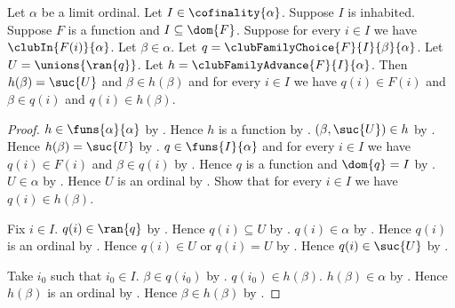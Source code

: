 \begin{proposition}\label{club_family_advance_properties}
    Let $\alpha$ be a limit ordinal.
    Let $I\in\cofinality{\alpha}$.
    Suppose $I$ is inhabited.
    Suppose $F$ is a function and $I\subseteq\dom{F}$.
    Suppose for every $i\in I$ we have $\clubIn{F(i)}{\alpha}$.
    Let $\beta\in\alpha$.
    Let $q=\clubFamilyChoice{F}{I}{\beta}{\alpha}$.
    Let $U=\unions{\ran{q}}$.
    Let $h=\clubFamilyAdvance{F}{I}{\alpha}$.
    Then $h(\beta)=\suc{U}$ and $\beta\in h(\beta)$ and
        for every $i\in I$ we have
            $q(i)\in F(i)$ and $\beta\in q(i)$ and
            $q(i)\in h(\beta)$.
\end{proposition}
\begin{proof}
    $h\in\funs{\alpha}{\alpha}$
        by .
    Hence $h$ is a function by .
    $(\beta,\suc{U})\in h$ by .
    Hence $h(\beta)=\suc{U}$ by .
    $q\in\funs{I}{\alpha}$ and for every $i\in I$ we have
        $q(i)\in F(i)$ and $\beta\in q(i)$
        by .
    Hence $q$ is a function and $\dom{q}=I$
        by .
    $U\in\alpha$ by .
    Hence $U$ is an ordinal
        by .
    Show that for every $i\in I$ we have $q(i)\in h(\beta)$.
    \begin{subproof}
        Fix $i\in I$.
        $q(i)\in\ran{q}$ by .
        Hence $q(i)\subseteq U$ by .
        $q(i)\in\alpha$ by .
        Hence $q(i)$ is an ordinal
            by .
        Hence $q(i)\in U$ or $q(i)=U$
            by .
        Hence $q(i)\in\suc{U}$ by .
    \end{subproof}
    Take $i_0$ such that $i_0\in I$.
    $\beta\in q(i_0)$ by .
    $q(i_0)\in h(\beta)$.
    $h(\beta)\in\alpha$ by .
    Hence $h(\beta)$ is an ordinal
        by .
    Hence $\beta\in h(\beta)$ by .
\end{proof}

